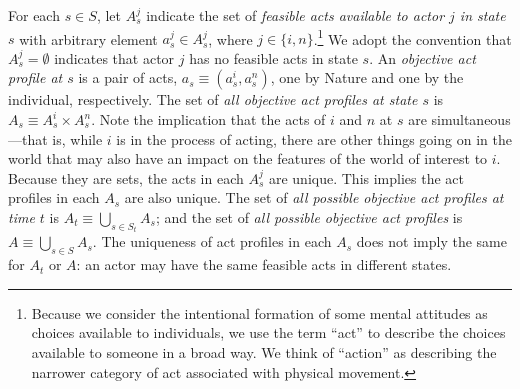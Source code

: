 \documentclass[
11pt,
titlepage,
reqno,
]{article}%
\theoremstyle{definition}
\begin{document}
For each  $s\in S$, let $A^j_s$ indicate the set of \textit{feasible acts available to actor $j$ in state $s$} with arbitrary element $a^j_s\in A^j_s$, where $j\in\{i,n\}$.\footnote
{
	Because we consider the intentional formation of some mental attitudes as choices available to individuals, we use the term ``act'' to describe the choices available to someone in a broad way.
	We think of ``action'' as describing the narrower category of act associated with physical movement.
} 
We adopt the convention that $A^j_s=\emptyset$ indicates that actor $j$ has no feasible acts in state $s$.
An \textit{objective act profile at $s$}  is a pair of acts, $a_s\equiv(a^i_s,a^n_s)$, one by Nature and one by the individual, respectively. 
The set of \textit{all objective act profiles at state $s$} is $A_s\equiv A^i_s\times A^n_s$.
Note the implication that the acts of $i$ and $n$ at $s$ are simultaneous---that is, while $i$ is in the process of acting, there are other things going on in the world that may also have an impact on the features of the world of interest to $i$.
Because they are sets, the acts in each $A^j_s$ are unique.
This implies the act profiles in each $A_s$ are also unique.
The set of \textit{all possible objective act profiles at time $t$} is  $A_t\equiv \bigcup_{s\in S_t} A_s$; and the set of \textit{all possible objective act profiles} is $A\equiv \bigcup_{s\in S} A_s$.
The uniqueness of act profiles in each $A_s$ does not imply the same for $A_t$ or $A$: an actor may have the same feasible acts in different states.
 
\end{document}
